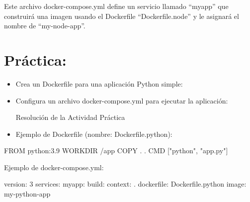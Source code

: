 \documentclass[
  a4paper,
  DIV=11,
  numbers=noendperiod,
  onepage,
  openany]{scrreprt}
\newenvironment{Shaded}{\begin{snugshade}}{\end{snugshade}}
\newcommand{\AttributeTok}[1]{\textcolor[rgb]{0.40,0.45,0.13}{#1}}
\newcommand{\FunctionTok}[1]{\textcolor[rgb]{0.28,0.35,0.67}{#1}}
\newcommand{\KeywordTok}[1]{\textcolor[rgb]{0.00,0.23,0.31}{#1}}
\newcommand{\NormalTok}[1]{\textcolor[rgb]{0.00,0.23,0.31}{#1}}
\newcommand{\StringTok}[1]{\textcolor[rgb]{0.13,0.47,0.30}{#1}}
\begin{document}
Este archivo docker-compose.yml define un servicio llamado ``myapp'' que
construirá una imagen usando el Dockerfile ``Dockerfile.node'' y le
asignará el nombre de ``my-node-app''.

\hypertarget{pruxe1ctica-2}{%
\section{Práctica:}\label{pruxe1ctica-2}}

\begin{itemize}
\item
  Crea un Dockerfile para una aplicación Python simple:
\item
  Configura un archivo docker-compose.yml para ejecutar la aplicación:

  Resolución de la Actividad Práctica
\item
  Ejemplo de Dockerfile (nombre: Dockerfile.python):
\end{itemize}

\begin{Shaded}
\begin{Highlighting}[]

\KeywordTok{FROM}\NormalTok{ python:3.9}
\KeywordTok{WORKDIR}\NormalTok{ /app}
\KeywordTok{COPY}\NormalTok{ . .}
\KeywordTok{CMD}\NormalTok{ [}\StringTok{"python"}\NormalTok{, }\StringTok{"app.py"}\NormalTok{]}
\end{Highlighting}
\end{Shaded}

Ejemplo de docker-compose.yml:

\begin{Shaded}
\begin{Highlighting}[]
\FunctionTok{version}\KeywordTok{:}\AttributeTok{ }\StringTok{\textquotesingle{}3\textquotesingle{}}
\FunctionTok{services}\KeywordTok{:}
\AttributeTok{  }\FunctionTok{myapp}\KeywordTok{:}
\AttributeTok{    }\FunctionTok{build}\KeywordTok{:}
\AttributeTok{      }\FunctionTok{context}\KeywordTok{:}\AttributeTok{ .}
\AttributeTok{      }\FunctionTok{dockerfile}\KeywordTok{:}\AttributeTok{ Dockerfile.python}
\AttributeTok{    }\FunctionTok{image}\KeywordTok{:}\AttributeTok{ my{-}python{-}app}
\end{Highlighting}
\end{Shaded}
\end{document}
